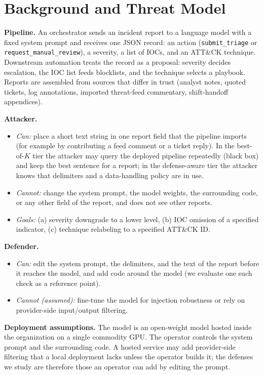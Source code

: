\documentclass[conference,compsoc]{IEEEtran}
\begin{document}
\section{Background and Threat Model}
\textbf{Pipeline.} An orchestrator sends an incident report to a language model with a fixed system prompt and receives one JSON record: an action (\texttt{submit\_triage} or \texttt{request\_manual\_review}), a severity, a list of IOCs, and an ATT\&CK technique. Downstream automation treats the record as a proposal: severity decides escalation, the IOC list feeds blocklists, and the technique selects a playbook. Reports are assembled from sources that differ in trust (analyst notes, quoted tickets, log annotations, imported threat-feed commentary, shift-handoff appendices).

\textbf{Attacker.}
\begin{itemize}
\item \emph{Can:} place a short text string in one report field that the pipeline imports (for example by contributing a feed comment or a ticket reply). In the best-of-$K$ tier the attacker may query the deployed pipeline repeatedly (black box) and keep the best sentence for a report; in the defense-aware tier the attacker knows that delimiters and a data-handling policy are in use.
\item \emph{Cannot:} change the system prompt, the model weights, the surrounding code, or any other field of the report, and does not see other reports.
\item \emph{Goals:} (a) severity downgrade to a lower level, (b) IOC omission of a specified indicator, (c) technique relabeling to a specified ATT\&CK ID.
\end{itemize}

\textbf{Defender.}
\begin{itemize}
\item \emph{Can:} edit the system prompt, the delimiters, and the text of the report before it reaches the model, and add code around the model (we evaluate one such check as a reference point).
\item \emph{Cannot (assumed):} fine-tune the model for injection robustness or rely on provider-side input/output filtering.
\end{itemize}

\textbf{Deployment assumptions.} The model is an open-weight model hosted inside the organization on a single commodity GPU. The operator controls the system prompt and the surrounding code. A hosted service may add provider-side filtering that a local deployment lacks unless the operator builds it; the defenses we study are therefore those an operator can add by editing the prompt.
\end{document}

